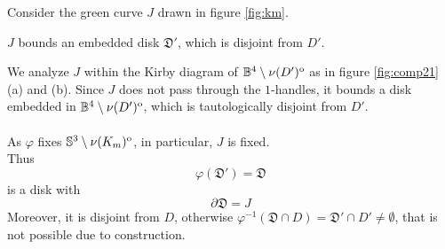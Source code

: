 Consider the green curve $J$ drawn in figure \ref{fig:km}. \\
\begin{cla}$J$ bounds an embedded disk $\mathfrak{D}'$, which is disjoint from $D'$.
\end{cla}
We analyze $J$ within the Kirby diagram of $\mathbb{B}^4 \setminus \nu(D')^{\mathrm{o}}$ as in figure \ref{fig:comp21} (a) and (b). Since $J$ does not pass through the $1$-handles, it bounds a disk embedded in $\mathbb{B}^4 \setminus \nu(D')^{\mathrm{o}}$, which is tautologically disjoint from $D'$.
\\ \\ 
As $\varphi$ fixes $\mathbb{S}^3 \setminus \nu(K_m)^{\mathrm{o}}$, in particular, $J$ is fixed. \\
Thus $$
\varphi(\mathfrak{D}') = \mathfrak{D} 
$$is a disk with $$
\partial \mathfrak{D} = J
$$
Moreover, it is disjoint from $D$, otherwise $\varphi^{-1}(\mathfrak{D}\cap D) = \mathfrak{D'} \cap D' \neq \emptyset$, that is not possible due to construction. 

